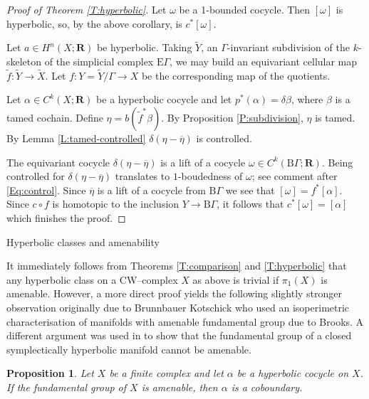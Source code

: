 \documentclass[12pt,reqno,a4paper]{amsart}
\makeatletter
\def\section{\@startsection{section}{1}%
  \z@{.7\linespacing\@plus\linespacing}{.5\linespacing}%
  {\normalfont\bfseries\raggedright\boldmath}}
\newtheorem{proposition}[subsection]{Proposition}
\theoremstyle{definition}
\theoremstyle{remark}
\numberwithin{equation}{section}
\numberwithin{figure}{section}
\newcommand{\B}[1]{{\mathbf #1}}
\newcommand{\R}{\mathrm}
\makeatother
\begin{document}
\begin{proof}[Proof of Theorem \ref{T:hyperbolic}]
Let $\omega$ be a 1-bounded cocycle.  Then $[\omega]$ is hyperbolic,
so, by the above corollary, is $c^*[\omega]$.

Let $a\in H^n(X;\B R)$ be hyperbolic.  Taking $\widetilde Y$,
an $\Gamma$-invariant subdivision of the $k$-skeleton of the simplicial
complex $\R E\Gamma$, we may build an equivariant cellular map $\widetilde f\colon\widetilde Y\to\widetilde X$.
Let $f\colon Y=\widetilde Y/\Gamma\to X$ be the corresponding map of the quotients.

Let $\alpha \in C^k(X;\B R)$ be a hyperbolic cocycle and let
$p^*(\alpha)=\delta\beta$, where $\beta$ is a tamed cochain.
Define $\eta=b(\widetilde f^*\beta)$.  By Proposition \ref{P:subdivision},
$\eta$ is tamed.  By Lemma \ref{L:tamed-controlled} $\delta(\eta-\overline\eta)$ is controlled.

The equivariant cocycle $\delta(\eta-\overline\eta)$ is a lift of a cocycle 
$\omega\in C^k(\R B\Gamma;\B R)$.
Being controlled for $\delta(\eta-\overline\eta)$ translates to 
$1$-boudedness of $\omega$; see comment after \eqref{Eq:control}.
Since $\overline\eta$ is a lift of a cocycle from $\R B\Gamma$ we see that
$[\omega]=f^*[\alpha]$.
Since $c\circ f$ is homotopic to the inclusion $Y\to \R B\Gamma$,
it follows that $c^*[\omega]=[\alpha]$
which finishes the proof.
\end{proof}


\section{Hyperbolic classes and amenability}

It immediately follows from Theorems \ref{T:comparison} and \ref{T:hyperbolic} that
any hyperbolic class on a CW--complex $X$ as above is trivial if $\pi_1(X)$ is
amenable. However, a more direct proof yields the following slightly stronger
observation originally due to Brunnbauer Kotschick \cite[Theorem
3.2]{arxiv.0808.1482} who used an isoperimetric characterisation of manifolds
with amenable fundamental group due to Brooks.
A different argument was used in \cite{zbMATH05597817} to show that the
fundamental group of a closed symplectically hyperbolic manifold cannot be
amenable.

\begin{proposition}\label{P:BK}
Let $X$ be a finite complex and let $\alpha$ be a hyperbolic cocycle on $X$.
If the fundamental group of $X$ is amenable, then $\alpha$ is a coboundary.
\end{proposition}
\end{document}
